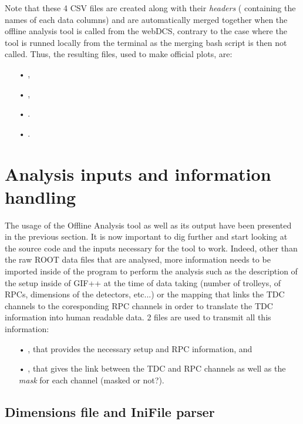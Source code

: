 	Note that these 4 CSV files are created along with their \textit{headers} ( containing the names of each data columns) and are automatically merged together when the offline analysis tool is called from the webDCS, contrary to the case where the tool is runned locally from the terminal as the merging bash script is then not called. Thus, the resulting files, used to make official plots, are:

	\begin{itemize}
		\item[•]  ,
		\item[•]  ,
		\item[•]  .
		\item[•]  .
	\end{itemize}
	
\section{Analysis inputs and information handling}
\label{app2:sec:inputs}
	
	The usage of the Offline Analysis tool as well as its output have been presented in the previous section. It is now important to dig further and start looking at the source code and the inputs necessary for the tool to work. Indeed, other than the raw ROOT data files that are analysed, more information needs to be imported inside of the program to perform the analysis such as the description of the setup inside of GIF++ at the time of data taking (number of trolleys, of RPCs, dimensions of the detectors, etc...) or the mapping that links the TDC channels to the coresponding RPC channels in order to translate the TDC information into human readable data. 2 files are used to transmit all this information:\\
	
	\begin{itemize}
		\item[•] , that provides the necessary setup and RPC information, and
		\item[•] , that gives the link between the TDC and RPC channels as well as the \textit{mask} for each channel (masked or not?).
	\end{itemize}
	
	\subsection{Dimensions file and IniFile parser}
	\label{app2:ssec:dimensions}
	

